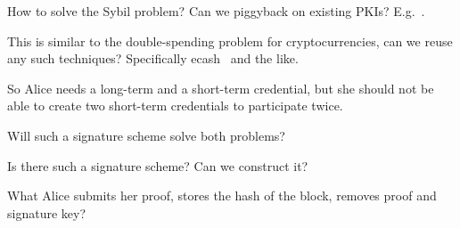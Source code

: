 \begin{frame}
  \begin{question}
    How to solve the Sybil problem?
    Can we piggyback on existing \acp{PKI}?
    E.g.~\cite{Cinderella}.
  \end{question}
  \begin{question}
    This is similar to the double-spending problem for cryptocurrencies, can 
    we reuse any such techniques?
    Specifically ecash~\cite{ecash} and the like.
  \end{question}
\end{frame}

So Alice needs a long-term and a short-term credential, but she should not be 
able to create two short-term credentials to participate twice.

\begin{frame}
  \begin{question}
    Will such a signature scheme solve both problems?
  \end{question}
  \begin{question}
    Is there such a signature scheme?
    Can we construct it?
  \end{question}
  \begin{question}
    What Alice submits her proof, stores the hash of the block, removes proof 
    and signature key?
  \end{question}
\end{frame}

